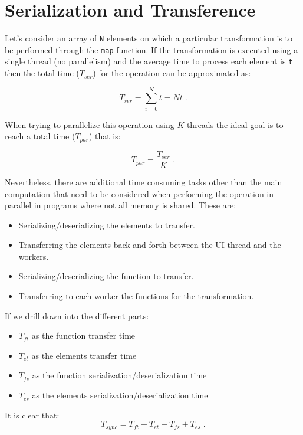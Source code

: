 \documentclass[runningheads,a4paper]{llncs}
\begin{document}
\section{Serialization and Transference}\label{sec-ser-transf}
Let's consider an array of \verb+N+ elements on which a particular transformation is to be performed through the \verb+map+ function. If the transformation is executed using a single thread (no parallelism) and the average time to process each element is \verb+t+ then the total time (\(T_{ser}\)) for the operation can be approximated as:

\begin{equation}
  T_{ser} = \sum_{i = 0}^{N}t = Nt \;  .
\end{equation}

When trying to parallelize this operation using \(K\) threads the ideal goal is to reach a total time (\(T_{par}\)) that is:

\begin{equation}
  T_{par} = \frac{T_{ser}}{K} \;  .
\end{equation}

Nevertheless, there are additional time consuming tasks other than the main computation that need to be considered when performing the operation in parallel in programs where not all memory is shared. These are:
\begin{itemize}
  \item Serializing/deserializing the elements to transfer.
  \item Transferring the elements back and forth between the UI thread and the workers.
  \item Serializing/deserializing the function to transfer.
  \item Transferring to each worker the functions for the transformation.
\end{itemize}

If we drill down into the different parts:
\begin{itemize}
  \item \(T_{ft}\) as the function transfer time
  \item \(T_{et}\) as the elements transfer time
  \item \(T_{fs}\) as the function serialization/deserialization time
  \item \(T_{es}\) as the elements serialization/deserialization time
\end{itemize}

It is clear that:
\begin{equation}
  T_{sync} = T_{ft} + T_{et} + T_{fs} + T_{es} \;  .
  \label{eq-tsync}
\end{equation}
\end{document}
